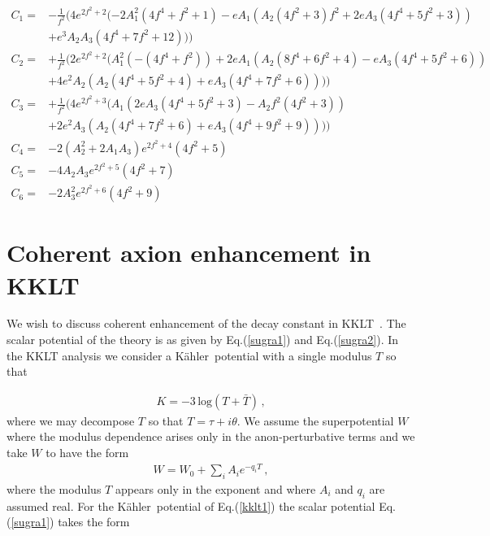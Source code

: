 \documentclass[12pt]{article}
\def\K{K\"ahler~}
\begin{document}
\begin{align}
  C_1 = & - \frac{1}{f^2} (4  {e}^{2  {f}^{2} + 2}  ( - 2  {A}_{1}^{2}  \left( 4  {f}^{4} + {f}^{2} + 1 \right) - e  {A}_{1}  \left( {A}_{2}  \left( 4  {f}^{2} + 3 \right)  {f}^{2} + 2  e  {A}_{3}  \left( 4  {f}^{4} + 5  {f}^{2} + 3 \right) \right) \nonumber\\
        & + {e}^{3}  {A}_{2}  {A}_{3}  \left( 4  {f}^{4} + 7  {f}^{2} + 12 \right) ))\nonumber\\
  C_2=  & + \frac{1}{f^2}(2  {e}^{2  {f}^{2} + 2}  ( {A}_{1}^{2}  \left( - \left( 4  {f}^{4} + {f}^{2} \right) \right) + 2  e  {A}_{1}  \left( {A}_{2}  \left( 8  {f}^{4} + 6  {f}^{2} + 4 \right) - e  {A}_{3}  \left( 4  {f}^{4} + 5  {f}^{2} + 6 \right) \right) \nonumber\\
        & + 4  {e}^{2}  {A}_{2}  \left( {A}_{2}  \left( 4  {f}^{4} + 5  {f}^{2} + 4 \right) + e  {A}_{3}  \left( 4  {f}^{4} + 7  {f}^{2} + 6 \right) \right) ))\nonumber\\
  C_3=  & + \frac{1}{f^2}(4  {e}^{2  {f}^{2} + 3}  ( {A}_{1}  \left( 2  e  {A}_{3}  \left( 4  {f}^{4} + 5  {f}^{2} + 3 \right) - {A}_{2}  {f}^{2}  \left( 4  {f}^{2} + 3 \right) \right) \nonumber\\
        & + 2  {e}^{2}  {A}_{3}  \left( {A}_{2}  \left( 4  {f}^{4} + 7  {f}^{2} + 6 \right) + e  {A}_{3}  \left( 4  {f}^{4} + 9  {f}^{2} + 9 \right) \right) ))\nonumber\\
  C_4=  & - 2  \left( {A}_{2}^{2} + 2  {A}_{1}  {A}_{3} \right)  {e}^{2  {f}^{2} + 4}  \left( 4  {f}^{2} + 5 \right) \nonumber\\
  C_5=  & - 4  {A}_{2}  {A}_{3}  {e}^{2  {f}^{2} + 5}  \left( 4  {f}^{2} + 7 \right) \nonumber\\
  C_6=  & - 2  {A}_{3}^{2}  {e}^{2  {f}^{2} + 6}  \left( 4  {f}^{2} + 9 \right)
  \label{c1}
\end{align}


\section{Coherent axion enhancement in KKLT\label{sec5}}
We wish to discuss coherent enhancement of the decay constant in KKLT~\cite{Kachru:2003aw}.
The scalar potential of the theory is as given by Eq.(\ref{sugra1}) and Eq.(\ref{sugra2}).
In the KKLT analysis we consider a \K potential with a single modulus $T$ so that

\begin{align}
  K = -3 \, \text{log}(T+ \bar T)\,,
  \label{kklt1}
\end{align}
where we may decompose $T$ so that
$T= \tau + i \theta$.
We assume  the superpotential $W$ where the modulus dependence arises only in the  anon-perturbative terms
and we take  $W$ to have the form
\begin{align}
  W= W_0 +\sum_{i} A_i  e^{- q_iT}\,,
  \label{w0A}
\end{align}
where the modulus $T$ appears only in the exponent and  where $A_i$ and $q_i$ are assumed real.
For the \K potential of Eq.(\ref{kklt1}) the scalar potential Eq. (\ref{sugra1}) takes the form
\end{document}
